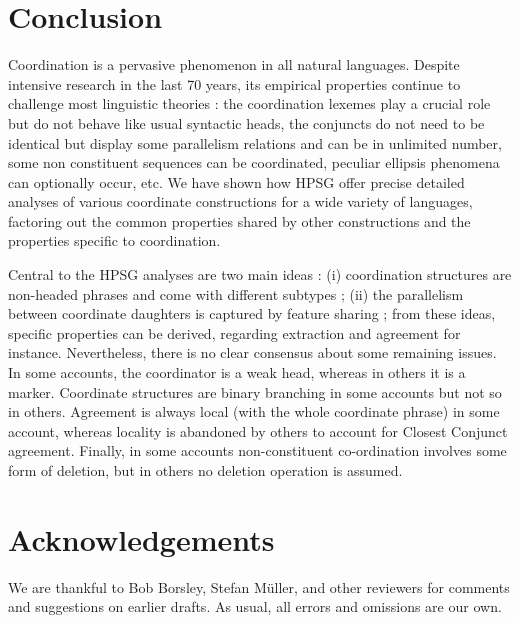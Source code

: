 \documentclass[output=paper
                ,modfonts
                ,nonflat
	        ,collection
	        ,collectionchapter
	        ,collectiontoclongg
 	        ,biblatex
                ,babelshorthands
                ,newtxmath
                ,draftmode
                ,colorlinks, citecolor=brown
]{./langsci/langscibook}
\begin{document}
\section{Conclusion}

Coordination is a pervasive phenomenon in all natural languages. Despite intensive research in the last 70 years, its empirical properties continue to challenge most linguistic theories :  the coordination lexemes play a crucial role but do not behave like usual syntactic heads, the conjuncts do not need to be identical but display some parallelism relations and can be in unlimited number, some non constituent sequences can be coordinated, peculiar ellipsis phenomena can optionally occur,  etc. We have shown how HPSG offer precise detailed analyses of various coordinate constructions for a wide variety of languages, factoring out the common properties shared by other constructions and the properties specific to coordination.

Central to the HPSG analyses are two main ideas : (i) coordination structures are non-headed phrases and come with different subtypes ; (ii) the parallelism between coordinate daughters is captured by feature sharing ; from these ideas, specific properties can be derived, regarding extraction and agreement for instance. Nevertheless, there is no clear consensus about some remaining issues. In some accounts, the coordinator is a weak head, whereas in others it is a marker. Coordinate structures are binary branching in some accounts but not so in others. Agreement is always local (with the whole coordinate phrase) in some account, whereas locality is abandoned by others to account for Closest Conjunct agreement. Finally, in some accounts non-constituent co-ordination involves some form of deletion, but in others no deletion operation is assumed.

 
\section*{Acknowledgements}

We are thankful to Bob Borsley, Stefan M\"{u}ller, and other reviewers for comments and suggestions on earlier drafts. 
As usual, all errors and omissions are our own.


{\sloppy
\printbibliography[heading=subbibliography,notkeyword=this] 
}
\end{document}
